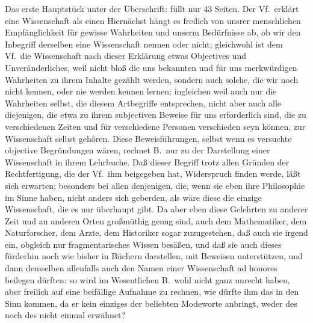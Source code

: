Das erste Hauptstück unter der Überschrift:  füllt nur 43 Seiten. Der Vf.\ erklärt eine Wissenschaft als einen  Hiernächst hängt es freilich von unsrer menschlichen Empfänglichkeit für gewisse Wahrheiten und unserm Bedürfnisse ab, ob wir den Inbegriff derselben eine Wissenschaft nennen oder nicht; gleichwohl ist dem Vf.\ die Wissenschaft nach dieser Erklärung etwas Objectives und Unveränderliches, weil nicht bloß die uns bekannten und für uns merkwürdigen Wahrheiten zu ihrem Inhalte gezählt werden, sondern auch solche, die wir noch nicht kennen, oder nie werden kennen lernen; ingleichen weil auch nur die Wahrheiten selbst, die diesem Artbegriffe entsprechen, nicht aber auch alle diejenigen, die etwa zu ihrem subjectiven Beweise für uns erforderlich sind, die zu verschiedenen Zeiten und für verschiedene Personen verschieden seyn können, zur Wissenschaft selbst gehören. Diese Beweisführungen, selbst wenn es versuchte objective Begründungen wären, rechnet B.\ nur zu der Darstellung einer Wissenschaft in ihrem Lehrbuche. Daß dieser Begriff trotz allen Gründen der Rechtfertigung, die der Vf.\ ihm beigegeben hat, Widerspruch finden werde, läßt sich erwarten; besonders bei allen denjenigen, die, wenn sie eben ihre Philosophie im Sinne haben, nicht anders sich geberden, als wäre diese die einzige Wissenschaft, die es nur überhaupt gibt. Da aber eben diese Gelehrten zu anderer Zeit und an anderen Orten großmüthig genug sind, auch dem Mathematiker, dem Naturforscher, dem Arzte, dem Historiker sogar zuzugestehen, daß auch sie irgend ein, obgleich nur fragmentarisches Wissen besäßen, und daß sie auch dieses fürderhin noch wie bisher in Büchern darstellen, mit Beweisen unterstützen, und dann demselben allenfalls auch den Namen einer Wissenschaft ad honores beilegen dürften: so wird im Wesentlichen B.\ wohl nicht ganz unrecht haben, aber freilich auf eine beifällige Aufnahme zu rechnen, wie dürfte ihm das in den Sinn kommen, da er kein einziges der beliebten Modeworte anbringt, weder des  noch des  nicht einmal  erwähnet? \par 
